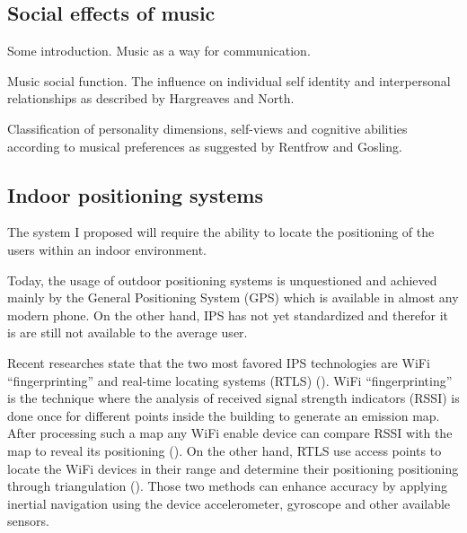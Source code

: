 \subsection{Social effects of music}



Some introduction.
Music as a way for communication.

Music social function.
The influence on individual self identity and interpersonal relationships as described by Hargreaves and North.

Classification of personality dimensions, self-views and cognitive abilities according to musical preferences as suggested by Rentfrow and Gosling.


\subsection{Indoor positioning systems}

The system I proposed will require the ability to locate the positioning of the users within an indoor environment.

Today, the usage of outdoor positioning systems is unquestioned and achieved mainly by the General Positioning System (GPS) which is available in almost any modern phone.
On the other hand, IPS has not yet standardized and therefor it is are still not available to the average user.

Recent researches state that the two most favored IPS technologies are WiFi ``fingerprinting'' and real-time locating systems (RTLS) (\cite{web:harrop}).
WiFi ``fingerprinting'' is the technique where the analysis of received signal strength indicators (RSSI) is done once for different points inside the building to generate an emission map.
After processing such a map any WiFi enable device can compare RSSI with the map to reveal its positioning (\cite{chen}).
On the other hand, RTLS use access points to locate the WiFi devices in their range and determine their positioning positioning through triangulation (\cite{liu}).
Those two methods can enhance accuracy by applying inertial navigation using the device accelerometer, gyroscope and other available sensors.